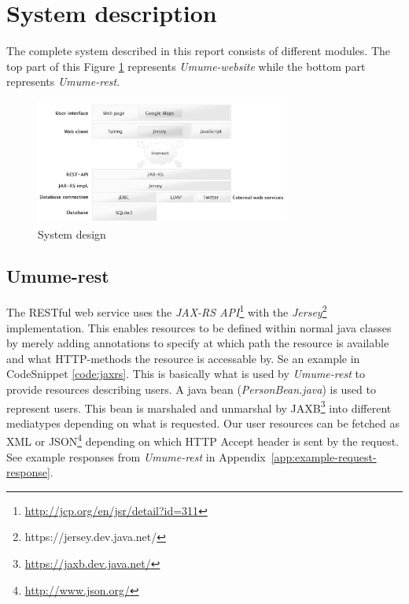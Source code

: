 \documentclass[titlepage, twocolumn, a4paper, 10pt]{article}
\begin{document}
\section{System description}\label{sec:system}



The complete system described in this report consists of different
modules. The top part of this Figure \ref{fig:images/sysdes}
represents \textit{Umume-website} while the bottom part represents
\textit{Umume-rest}.

\begin{figure}[H]
  \centering
  \includegraphics[width=3.3in]{images/systemarchitecture.jpg}
  \caption{System design}
  \label{fig:images/sysdes}
\end{figure}

\subsection{Umume-rest}\label{sec:umume-rest}
The RESTful web service uses the \textit{JAX-RS
  API}\footnote{\url{http://jcp.org/en/jsr/detail?id=311}} with the
\textit{Jersey}\footnote{https://jersey.dev.java.net/} implementation.
This enables resources to be defined within normal java classes by
merely adding annotations to specify at which path the resource is
available and what HTTP-methods the resource is accessable by. Se an
example in CodeSnippet \ref{code:jaxrs}. This is basically what is
used by \textit{Umume-rest} to provide resources describing users. A
java bean (\textit{PersonBean.java}) is used to represent users. This
bean is marshaled and unmarshal by
JAXB\footnote{\url{https://jaxb.dev.java.net/}} into different
mediatypes depending on what is requested. Our user resources can be
fetched as XML or JSON\footnote{\url{http://www.json.org/}} depending
on which HTTP Accept header is sent by the request. See example
responses from \textit{Umume-rest} in
Appendix~\ref{app:example-request-response}.
\end{document}
